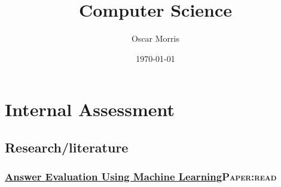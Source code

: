 \documentclass[11pt]{article}
\author{Oscar Morris}
\date{\today}
\title{Computer Science}
\begin{document}
\maketitle
\tableofcontents


\section{Internal Assessment}
\label{sec:org07bb5d0}
\subsection{Research/literature}
\label{sec:org4a29c24}
\subsubsection{\href{./cs/Answer\_Evaluation\_with\_ML.pdf}{Answer Evaluation Using Machine Learning}\hfill{}\textsc{Paper:read}}
\label{sec:org76feeec}
\end{document}
